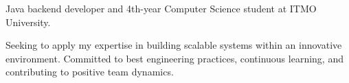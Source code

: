 \par{
Java backend developer and 4th-year Computer Science student at ITMO University.

Seeking to apply my expertise in building scalable systems within an innovative environment.
Committed to best engineering practices, continuous learning, and contributing to positive team dynamics.
}
\vspace{1em}
